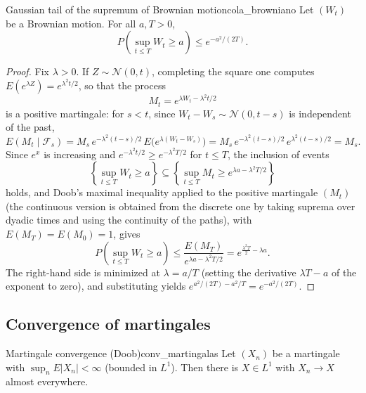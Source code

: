 \documentclass[11pt, a4paper]{article}
\begin{document}
\begin{corolario}{Gaussian tail of the supremum of Brownian motion}{cola_browniano}
Let $(W_t)$ be a Brownian motion. For all $a, T > 0$,
$$ P\!\left(\sup_{t \le T} W_t \ge a\right) \le e^{-a^2/(2T)}. $$
\end{corolario}

\begin{proof}
Fix $\lambda > 0$. If $Z \sim \mathcal{N}(0, t)$, completing the square one computes
$E(e^{\lambda Z}) = e^{\lambda^2 t/2}$, so that the process
$$ M_t = e^{\lambda W_t - \lambda^2 t / 2} $$
is a positive martingale: for $s < t$, since $W_t - W_s \sim \mathcal{N}(0, t - s)$ is
independent of the past,
$$ E(M_t \mid \mathcal{F}_s) = M_s \, e^{-\lambda^2 (t - s)/2} \, E\big(e^{\lambda (W_t -
W_s)}\big) = M_s \, e^{-\lambda^2 (t-s)/2} \, e^{\lambda^2 (t-s)/2} = M_s. $$
Since $e^x$ is increasing and $e^{-\lambda^2 t/2} \ge e^{-\lambda^2 T/2}$ for $t \le T$, the
inclusion of events
$$ \left\{ \sup_{t \le T} W_t \ge a \right\} \subseteq \left\{ \sup_{t \le T} M_t \ge
e^{\lambda a - \lambda^2 T/2} \right\} $$
holds, and Doob's maximal inequality applied to the positive martingale $(M_t)$ (the
continuous version is obtained from the discrete one by taking suprema over dyadic times and using the
continuity of the paths), with $E(M_T) = E(M_0) = 1$, gives
$$ P\!\left(\sup_{t \le T} W_t \ge a\right) \le \frac{E(M_T)}{e^{\lambda a - \lambda^2 T/2}} =
e^{\frac{\lambda^2 T}{2} - \lambda a}. $$
The right-hand side is minimized at $\lambda = a/T$ (setting the derivative $\lambda T - a$ of the
exponent to zero), and substituting yields $e^{a^2/(2T) - a^2/T} = e^{-a^2/(2T)}$.
\end{proof}

\subsection{Convergence of martingales}

\begin{teorema}{Martingale convergence (Doob)}{conv_martingalas}
Let $(X_n)$ be a martingale with $\sup_n E|X_n| < \infty$ (bounded in $L^1$). Then there is
$X \in L^1$ with $X_n \to X$ almost everywhere.
\end{teorema}
\end{document}
